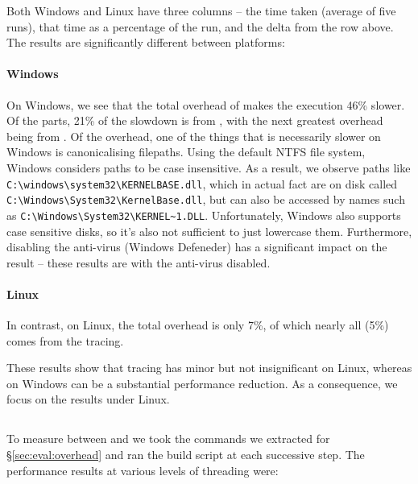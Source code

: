 Both Windows and Linux have three columns -- the time taken (average of five runs), that time as a percentage of the \Make run, and the delta from the row above. The results are significantly different between platforms:

\paragraph{Windows} On Windows, we see that the total overhead of \Rattle makes the execution 46\% slower. Of the parts, 21\% of the slowdown is from \Fsatrace, with the next greatest overhead being from \Rattle. Of the \Rattle overhead, one of the things that is necessarily slower on Windows is canonicalising filepaths. Using the default NTFS file system, Windows considers paths to be case insensitive. As a result, we observe paths like \verb"C:\windows\system32\KERNELBASE.dll", which in actual fact are on disk called \verb"C:\Windows\System32\KernelBase.dll", but can also be accessed by names such as \verb"C:\Windows\System32\KERNEL~1.DLL". Unfortunately, Windows also supports case sensitive disks, so it's also not sufficient to just lowercase them. Furthermore, disabling the anti-virus (Windows Defeneder) has a significant impact on the result -- these results are with the anti-virus disabled.

\paragraph{Linux} In contrast, on Linux, the total overhead is only 7\%, of which nearly all (5\%) comes from the tracing.

\postparagraphs

These results show that tracing has minor but not insignificant on Linux, whereas on Windows can be a substantial performance reduction. As a consequence, we focus on the results under Linux.

\subsection{\Fsatrace}
\label{sec:eval:fsatrace}

To measure \Fsatrace between \Make and \Rattle we took the commands we extracted for \S\ref{sec:eval:overhead} and ran the build script at each successive step. The performance results at various levels of threading were:

